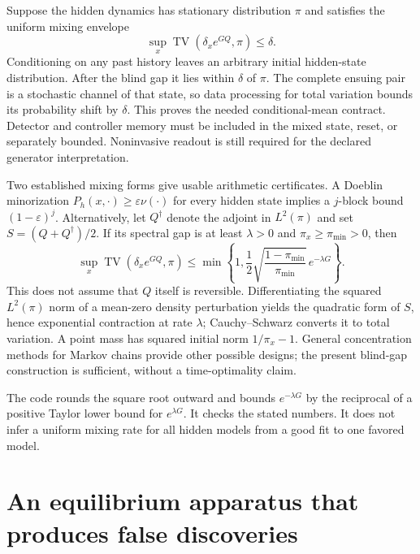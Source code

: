 Suppose the hidden dynamics has stationary distribution $\pi$ and satisfies
the uniform mixing envelope
\begin{equation}
 \sup_x\operatorname{TV}\!\left(\delta_x e^{GQ},\pi\right)\le\delta.
 \label{vl:uniform-mixing}
\end{equation}
Conditioning on any past history leaves an arbitrary initial hidden-state
distribution. After the blind gap it lies within $\delta$ of $\pi$. The
complete ensuing pair is a stochastic channel of that state, so data processing
for total variation bounds its probability shift by $\delta$. This proves the
needed conditional-mean contract. Detector and controller memory must be
included in the mixed state, reset, or separately bounded. Noninvasive readout
is still required for the declared generator interpretation.

Two established mixing forms give usable arithmetic certificates. A Doeblin
minorization $P_h(x,\cdot)\ge\varepsilon\nu(\cdot)$ for every hidden state
implies a $j$-block bound $(1-\varepsilon)^j$. Alternatively, let
$Q^\dagger$ denote the adjoint in $L^2(\pi)$ and set
$S=(Q+Q^\dagger)/2$. If its spectral gap is at least $\lambda>0$ and
$\pi_x\ge\pi_{\min}>0$, then
\begin{equation}
 \sup_x\operatorname{TV}\!\left(\delta_x e^{GQ},\pi\right)
 \le\min\!\left\{1,
 \frac12\sqrt{\frac{1-\pi_{\min}}{\pi_{\min}}}\,e^{-\lambda G}\right\}.
 \label{vl:spectral-mixing}
\end{equation}
This does not assume that $Q$ itself is reversible. Differentiating the squared
$L^2(\pi)$ norm of a mean-zero density perturbation yields the quadratic form
of $S$, hence exponential contraction at rate $\lambda$; Cauchy--Schwarz
converts it to total variation. A point mass has squared initial norm
$1/\pi_x-1$. General concentration methods for Markov chains provide other
possible designs\cite{vlPaulin2015}; the present blind-gap construction is
sufficient, without a time-optimality claim.

The code rounds the square root outward and bounds $e^{-\lambda G}$ by the
reciprocal of a positive Taylor lower bound for $e^{\lambda G}$. It checks
the stated numbers. It does not infer a uniform mixing rate for all hidden
models from a good fit to one favored model.

\section{An equilibrium apparatus that produces false discoveries}

